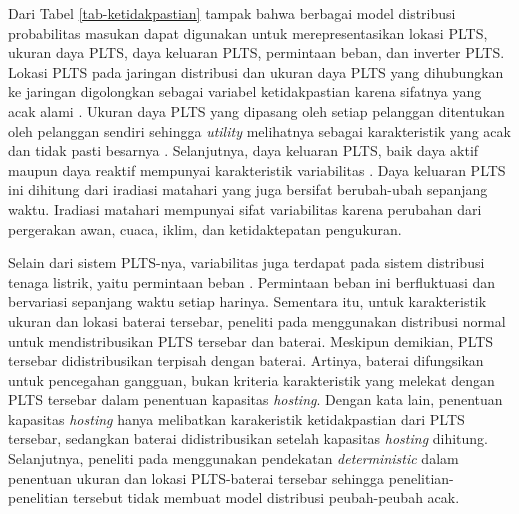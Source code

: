 {Dari Tabel \ref{tab-ketidakpastian} tampak bahwa berbagai model distribusi probabilitas masukan dapat digunakan untuk merepresentasikan lokasi PLTS, ukuran daya PLTS, daya keluaran PLTS, permintaan beban, dan inverter PLTS. Lokasi PLTS pada jaringan distribusi dan ukuran daya PLTS yang dihubungkan ke jaringan digolongkan sebagai variabel ketidakpastian karena sifatnya yang acak alami \cite{kharrazi_assessment_2020,shahnia_voltage_2011,dubey_estimation_2017,ding_distributed_2017,torquato_comprehensive_2018}. Ukuran daya PLTS yang dipasang oleh setiap pelanggan ditentukan oleh pelanggan sendiri sehingga \textit{utility} melihatnya sebagai karakteristik yang acak dan tidak pasti besarnya \cite{shahnia_voltage_2011,kharrazi_assessment_2020,dubey_estimation_2017,ding_distributed_2017}. Selanjutnya, daya keluaran PLTS, baik daya aktif maupun daya reaktif mempunyai karakteristik variabilitas \cite{ruiz-rodriguez_probabilistic_2012,dubey_estimation_2017,ding_distributed_2017,silva_stochastic_2016}. Daya keluaran PLTS ini dihitung dari iradiasi matahari yang juga bersifat berubah-ubah sepanjang waktu. Iradiasi matahari mempunyai sifat variabilitas karena perubahan dari pergerakan awan, cuaca, iklim, dan ketidaktepatan pengukuran.

Selain dari sistem PLTS-nya, variabilitas juga terdapat pada sistem distribusi tenaga listrik, yaitu permintaan beban \cite{dubey_estimation_2017,ding_distributed_2017,torquato_comprehensive_2018}. Permintaan beban ini berfluktuasi dan bervariasi sepanjang waktu setiap harinya. Sementara itu, untuk karakteristik ukuran dan lokasi baterai tersebar, peneliti pada \cite{al-saffar_reinforcement_2020} menggunakan distribusi normal untuk mendistribusikan PLTS tersebar dan baterai. Meskipun demikian, PLTS tersebar didistribusikan terpisah dengan baterai. Artinya, baterai difungsikan untuk pencegahan gangguan, bukan kriteria karakteristik yang melekat dengan PLTS tersebar dalam penentuan kapasitas \textit{hosting}. Dengan kata lain, penentuan kapasitas \textit{hosting} hanya melibatkan karakeristik ketidakpastian dari PLTS tersebar, sedangkan baterai didistribusikan setelah kapasitas \textit{hosting} dihitung. Selanjutnya, peneliti pada \cite{hashemi_efficient_2018,yang_sizing_2014} menggunakan pendekatan \textit{deterministic} dalam penentuan ukuran dan lokasi PLTS-baterai tersebar sehingga penelitian-penelitian tersebut tidak membuat model distribusi peubah-peubah acak.


}
